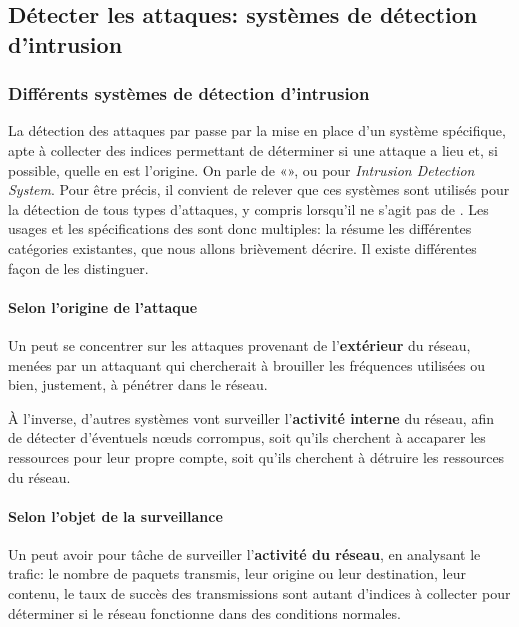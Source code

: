 \subsection{Détecter les attaques: systèmes de détection d'intrusion}

    \subsubsection{Différents systèmes de détection d'intrusion}
La détection des attaques par \dds passe par la mise en place d'un système spécifique, apte à collecter des indices permettant de déterminer si une attaque a lieu et, si possible, quelle en est l'origine.
On parle de «\ids», ou \IDS pour \textit{Intrusion Detection System}.
Pour être précis, il convient de relever que ces systèmes sont utilisés pour la détection de tous types d'attaques, y compris lorsqu'il ne s'agit pas de \dds.
Les usages et les spécifications des \IDS sont donc multiples: la  résume les différentes catégories existantes, que nous allons brièvement décrire.
Il existe différentes façon de les distinguer.


        \paragraph{Selon l'origine de l'attaque}
Un \ids peut se concentrer sur les attaques provenant de l'\textbf{extérieur} du réseau, menées par un attaquant qui chercherait à brouiller les fréquences utilisées ou bien, justement, à pénétrer dans le réseau.

À l'inverse, d'autres systèmes vont surveiller l'\textbf{activité interne} du réseau, afin de détecter d'éventuels nœuds corrompus, soit qu'ils cherchent à accaparer les ressources pour leur propre compte, soit qu'ils cherchent à détruire les ressources du réseau.

\pagebreak %

        \paragraph{Selon l'objet de la surveillance}\label{ea:sss:hids}
Un \IDS peut avoir pour tâche de surveiller l'\textbf{activité du réseau}, en analysant le trafic: le nombre de paquets transmis, leur origine ou leur destination, leur contenu, le taux de succès des transmissions sont autant d'indices à collecter pour déterminer si le réseau fonctionne dans des conditions normales.

